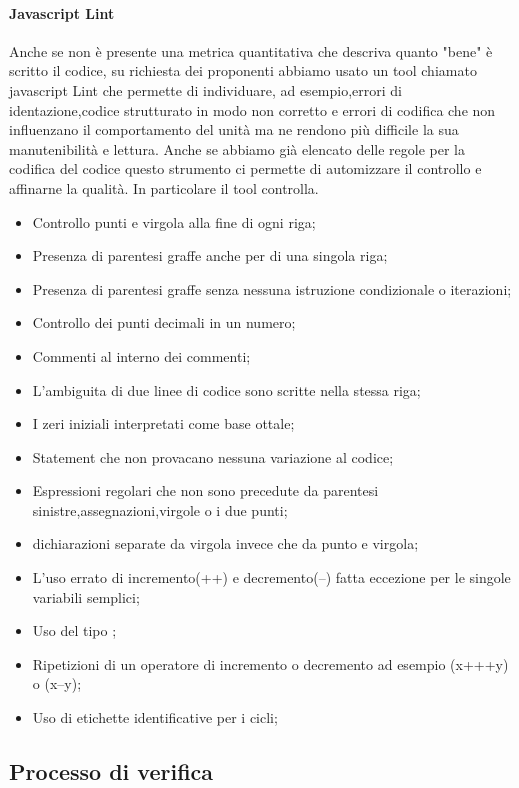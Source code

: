 \paragraph{Javascript Lint}
Anche se non è presente una metrica quantitativa che descriva quanto "bene" è scritto il codice, su richiesta dei proponenti abbiamo usato un tool chiamato javascript Lint che permette di individuare, ad esempio,errori di identazione,codice strutturato in modo non corretto e errori di codifica che non influenzano il comportamento del unità ma ne rendono più difficile la sua manutenibilità e lettura.
Anche se abbiamo già elencato delle regole per la codifica del codice questo strumento ci permette di automizzare il controllo e affinarne la qualità.
In particolare il tool  controlla.
\begin{itemize}
\item Controllo punti e virgola alla fine di ogni riga;
\item Presenza di parentesi graffe anche per  di una singola riga;
\item Presenza di parentesi graffe senza nessuna istruzione condizionale o iterazioni;
\item Controllo dei punti decimali in un numero;
\item Commenti al interno dei commenti;
\item L'ambiguita di due linee di codice sono scritte nella stessa riga;
\item I zeri iniziali interpretati come base ottale; 
\item Statement che non provacano nessuna variazione al codice;
\item Espressioni regolari che non sono precedute da parentesi sinistre,assegnazioni,virgole o i due punti;
\item dichiarazioni separate da virgola invece che da punto e virgola;
\item L'uso errato di incremento(++) e decremento(--) fatta eccezione per le singole variabili semplici;
\item Uso del tipo ;
\item Ripetizioni di un operatore di incremento o decremento ad esempio (x+++y) o (x--y);
\item Uso di etichette identificative per i cicli;
\end{itemize}

\subsection{Processo di verifica}
